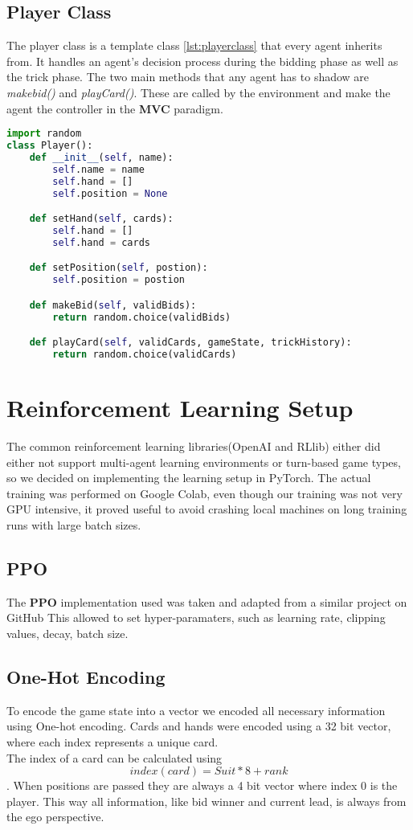 \subsection{Player Class}
The player class is a template class \ref{lst:playerclass} that every agent inherits from.
It handles an agent's decision process during the bidding phase as well as the trick phase.
The two main methods that any agent has to shadow are \textit{makebid()} and \textit{playCard()}.
These are called by the environment and make the agent the controller in the \textbf{MVC} paradigm.
\newline
\begin{lstlisting}[language=Python,label={lst:playerclass}]
import random
class Player():
    def __init__(self, name):
        self.name = name
        self.hand = []
        self.position = None

    def setHand(self, cards):
        self.hand = []
        self.hand = cards

    def setPosition(self, postion):
        self.position = postion

    def makeBid(self, validBids):
        return random.choice(validBids)

    def playCard(self, validCards, gameState, trickHistory):
        return random.choice(validCards)
\end{lstlisting}
\section{Reinforcement Learning Setup}
The common reinforcement learning libraries(OpenAI and RLlib) either did either not support multi-agent learning
environments or turn-based game types, so we decided on implementing the learning setup in PyTorch.
The actual training was performed on Google Colab, even though our training was not very GPU intensive, it proved
useful to avoid crashing local machines on long training runs with large batch sizes.
\subsection{PPO}
The \textbf{PPO} implementation used was taken and adapted from a similar project on GitHub \cite{emerich}
This allowed to set hyper-paramaters, such as learning rate, clipping values, decay, batch size.
\subsection{One-Hot Encoding}
To encode the game state into a vector we encoded all necessary information using One-hot encoding.
Cards and hands were encoded using a 32 bit vector, where each index represents a unique card.\\
The index of a card can be calculated using \[index(card) = Suit * 8 + rank\].
When positions are passed they are always a 4 bit vector where index 0 is the player.
This way all information, like bid winner and current lead, is always from the ego perspective.
